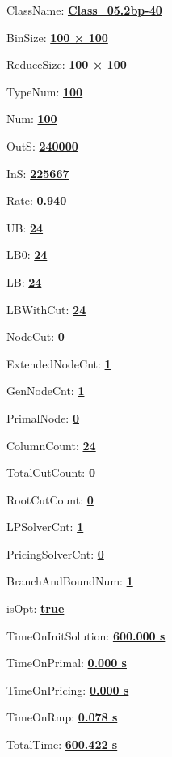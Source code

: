 \documentclass[11pt]{article}
\begin{document}
\pagestyle{empty}


ClassName: \underline{\textbf{Class_05.2bp-40}}
\par
BinSize: \underline{\textbf{100 × 100}}
\par
ReduceSize: \underline{\textbf{100 × 100}}
\par
TypeNum: \underline{\textbf{100}}
\par
Num: \underline{\textbf{100}}
\par
OutS: \underline{\textbf{240000}}
\par
InS: \underline{\textbf{225667}}
\par
Rate: \underline{\textbf{0.940}}
\par
UB: \underline{\textbf{24}}
\par
LB0: \underline{\textbf{24}}
\par
LB: \underline{\textbf{24}}
\par
LBWithCut: \underline{\textbf{24}}
\par
NodeCut: \underline{\textbf{0}}
\par
ExtendedNodeCnt: \underline{\textbf{1}}
\par
GenNodeCnt: \underline{\textbf{1}}
\par
PrimalNode: \underline{\textbf{0}}
\par
ColumnCount: \underline{\textbf{24}}
\par
TotalCutCount: \underline{\textbf{0}}
\par
RootCutCount: \underline{\textbf{0}}
\par
LPSolverCnt: \underline{\textbf{1}}
\par
PricingSolverCnt: \underline{\textbf{0}}
\par
BranchAndBoundNum: \underline{\textbf{1}}
\par
isOpt: \underline{\textbf{true}}
\par
TimeOnInitSolution: \underline{\textbf{600.000 s}}
\par
TimeOnPrimal: \underline{\textbf{0.000 s}}
\par
TimeOnPricing: \underline{\textbf{0.000 s}}
\par
TimeOnRmp: \underline{\textbf{0.078 s}}
\par
TotalTime: \underline{\textbf{600.422 s}}
\par
\newpage


\end{document}
